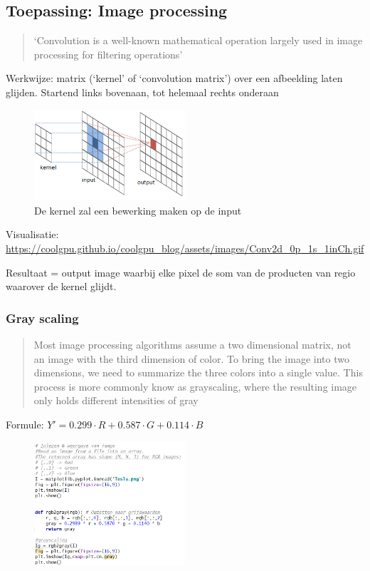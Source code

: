 \documentclass{article}
\begin{document}
\subsection{Toepassing: Image processing}

\begin{quote}
    `Convolution is a well-known mathematical operation largely used in
image processing for filtering operations'
\end{quote}

Werkwijze: matrix (`kernel' of `convolution matrix') over een afbeelding laten glijden.
Startend links bovenaan, tot helemaal rechts onderaan

\begin{figure}[H]
    \centering
    \includegraphics[width=0.5\textwidth]{convolution-kernel.png}
    \caption{De kernel zal een bewerking maken op de input}
\end{figure}

Visualisatie: \url{https://coolgpu.github.io/coolgpu_blog/assets/images/Conv2d_0p_1s_1inCh.gif}

Resultaat = output image waarbij elke pixel de som van de producten van regio waarover de kernel glijdt.

\subsubsection{Gray scaling}

\begin{quote}
    Most image processing algorithms assume a two dimensional matrix,
not an image with the third dimension of color. To bring the image into
two dimensions, we need to summarize the three colors into a single
value. This process is more commonly know as grayscaling, where the
resulting image only holds different intensities of gray
\end{quote}

Formule: $Y' = 0.299\cdot R + 0.587\cdot G + 0.114\cdot B$

\begin{figure}[H]
    \centering
    \includegraphics[width=0.5\textwidth]{convolution-grayscaling-python.png}
    \caption{}
\end{figure}
\end{document}
